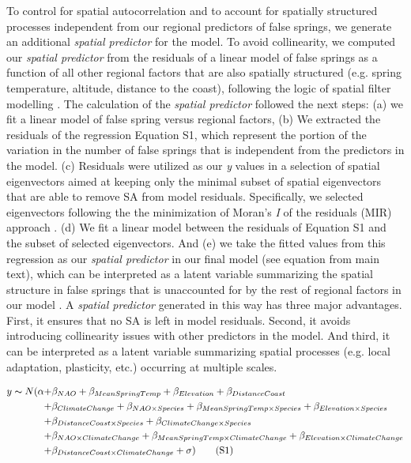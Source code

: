 \documentclass{article}\usepackage[]{graphicx}\usepackage[]{color}
\begin{document}
To control for spatial autocorrelation and to account for spatially structured processes independent from our regional predictors of false springs, we generate an additional \emph{spatial predictor} for the model. To avoid collinearity, we computed our \emph{spatial predictor} from the residuals of a linear model of false springs as a function of all other regional factors that are also spatially structured (e.g. spring temperature, altitude, distance to the coast), following the logic of spatial filter modelling \citep{diniz2005modelling}. The calculation of the \emph{spatial predictor} followed the next steps: (a) we fit a linear model of false spring versus regional factors, (b) We extracted the residuals of the regression Equation S1, which represent the portion of the variation in the number of false springs that is independent from the predictors in the model. (c) Residuals were utilized as our \textit{y} values in a selection of spatial eigenvectors aimed at keeping only the minimal subset of spatial eigenvectors that are able to remove SA from model residuals. Specifically, we selected eigenvectors following the the minimization of Moran's \textit{I} of the residuals (MIR) approach \citep{griffith2006spatial,diniz2012selection,Baumen2017}. (d) We fit a linear model between the residuals of Equation S1 and the subset of selected eigenvectors. And (e) we take the fitted values from this regression as our \emph{spatial predictor} in our final model (see equation from main text), which can be interpreted as a latent variable summarizing the spatial structure in false springs that is unaccounted for by the rest of regional factors in our model \citep{morales2012imprint}. A \emph{spatial predictor} generated in this way has three major advantages. First, it ensures that no SA is left in model residuals. Second, it avoids introducing collinearity issues with other predictors in the model. And third, it can be interpreted as a latent variable summarizing spatial processes (e.g. local adaptation, plasticity, etc.) occurring at multiple scales.

\begin{align*}
y \thicksim N(\alpha +&  \beta_{NAO} + \beta_{MeanSpringTemp} + \beta_{Elevation} + \beta_{DistanceCoast} \\ +& \beta_{ClimateChange}
+ \beta_{NAO \times Species} + \beta_{MeanSpringTemp \times Species} + \beta_{Elevation \times Species} \\ +& \beta_{DistanceCoast \times Species} + \beta_{ClimateChange \times Species} \\
+& \beta_{NAO \times ClimateChange} + \beta_{MeanSpringTemp \times ClimateChange} 
+ \beta_{Elevation \times ClimateChange} \\ +& \beta_{DistanceCoast \times ClimateChange} + \sigma) \tag{S1}
\end{align*}
\end{document}
